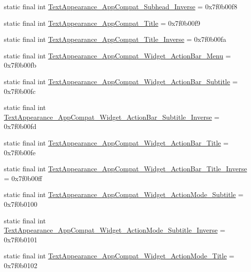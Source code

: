 \begin{CompactItemize}
static final int \hyperlink{classandroid_1_1support_1_1v7_1_1mediarouter_1_1_r_1_1style_2519679a8949741daf9c4ceffdba3d93}{TextAppearance\_\-AppCompat\_\-Subhead\_\-Inverse} = 0x7f0b00f8
\item 
static final int \hyperlink{classandroid_1_1support_1_1v7_1_1mediarouter_1_1_r_1_1style_a1c892a4dc1f0b3a8844a7f9f7a3b306}{TextAppearance\_\-AppCompat\_\-Title} = 0x7f0b00f9
\item 
static final int \hyperlink{classandroid_1_1support_1_1v7_1_1mediarouter_1_1_r_1_1style_4adb030e67c9f64374a5a1c3bdb54778}{TextAppearance\_\-AppCompat\_\-Title\_\-Inverse} = 0x7f0b00fa
\item 
static final int \hyperlink{classandroid_1_1support_1_1v7_1_1mediarouter_1_1_r_1_1style_17aa44e5f5dd72e00297c9dfcdd19934}{TextAppearance\_\-AppCompat\_\-Widget\_\-ActionBar\_\-Menu} = 0x7f0b00fb
\item 
static final int \hyperlink{classandroid_1_1support_1_1v7_1_1mediarouter_1_1_r_1_1style_04962182d5dec12dc154b4fbfad2deeb}{TextAppearance\_\-AppCompat\_\-Widget\_\-ActionBar\_\-Subtitle} = 0x7f0b00fc
\item 
static final int \hyperlink{classandroid_1_1support_1_1v7_1_1mediarouter_1_1_r_1_1style_64501b0d6229e30df9bd393ff658bc92}{TextAppearance\_\-AppCompat\_\-Widget\_\-ActionBar\_\-Subtitle\_\-Inverse} = 0x7f0b00fd
\item 
static final int \hyperlink{classandroid_1_1support_1_1v7_1_1mediarouter_1_1_r_1_1style_6533cca4649c35fdd7d60b552037e38b}{TextAppearance\_\-AppCompat\_\-Widget\_\-ActionBar\_\-Title} = 0x7f0b00fe
\item 
static final int \hyperlink{classandroid_1_1support_1_1v7_1_1mediarouter_1_1_r_1_1style_22a6594fc721a84dc5a49a4d5a79a76c}{TextAppearance\_\-AppCompat\_\-Widget\_\-ActionBar\_\-Title\_\-Inverse} = 0x7f0b00ff
\item 
static final int \hyperlink{classandroid_1_1support_1_1v7_1_1mediarouter_1_1_r_1_1style_b917d9cae1d69480ada9a7fe2d3da0b4}{TextAppearance\_\-AppCompat\_\-Widget\_\-ActionMode\_\-Subtitle} = 0x7f0b0100
\item 
static final int \hyperlink{classandroid_1_1support_1_1v7_1_1mediarouter_1_1_r_1_1style_2bf5c2f04e444f6fafb3a22c5cd8db20}{TextAppearance\_\-AppCompat\_\-Widget\_\-ActionMode\_\-Subtitle\_\-Inverse} = 0x7f0b0101
\item 
static final int \hyperlink{classandroid_1_1support_1_1v7_1_1mediarouter_1_1_r_1_1style_1e55316cad6d4687dfa019d208ddcbb8}{TextAppearance\_\-AppCompat\_\-Widget\_\-ActionMode\_\-Title} = 0x7f0b0102

\end{CompactItemize}
